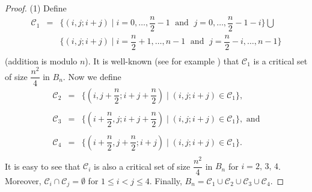 \documentclass[11pt]{article}
\begin{document}
\begin{proof} (1) Define 
$$\begin{array}{lcl}
{\mathcal C}_1 & = & \{(i,j;i+j)\mid i=0,\ldots,\dfrac{n}{2}-1\;
\mbox{ and }\;j=0,\ldots,\dfrac{n}{2}-1-i\}\bigcup \\
& & \{(i,j;i+j)\mid i=\dfrac{n}{2}+1,\ldots,n-1\;
\mbox{ and }\;j=\dfrac{n}{2}-i,\ldots,n-1\} \\
\end{array}$$
(addition is modulo $n$).
It is well-known (see for example \cite{doco}) that ${\mathcal C}_1$ is a 
critical set of size $\dfrac{n^2}{4}$ in $B_n$. Now we define
$$\begin{array}{lcl}
{\mathcal C}_2 & = & \{(i,j+\dfrac{n}{2};i+j+\dfrac{n}{2})\mid 
(i,j;i+j)\in {\mathcal C}_1\}, \\
&&\\
{\mathcal C}_3 & = & \{(i+\dfrac{n}{2},j;i+j+\dfrac{n}{2})\mid 
(i,j;i+j)\in {\mathcal C}_1\}, \mbox{ and}  \\
&&\\
{\mathcal C}_4 & = & \{(i+\dfrac{n}{2},j+\dfrac{n}{2};i+j)\mid 
(i,j;i+j)\in {\mathcal C}_1\}. \\
\end{array}$$
It is easy to see that ${\mathcal C}_i$ is also a critical set of 
size $\dfrac{n^2}{4}$ in $B_n$ for $i=2,\,3,\,4$. Moreover,
${\mathcal C}_i\cap {\mathcal C}_j=\emptyset$ for $1\leq i<j\leq 4$.
Finally,
$B_n= {\mathcal C}_1\cup {\mathcal C}_2\cup {\mathcal C}_3\cup 
{\mathcal C}_4.$


\end{proof}
\end{document}
